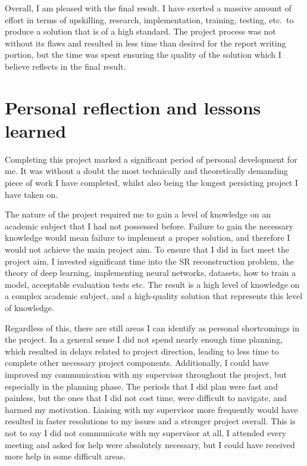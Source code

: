 \begin{appendices}
Overall, I am pleased with the final result. I have exerted a massive amount of effort in terms of upskilling, research, implementation, training, testing, etc.\ to produce a solution that is of a high standard. The project process was not without its flaws and resulted in less time than desired for the report writing portion, but the time was spent ensuring the quality of the solution which I believe reflects in the final result.

\section{Personal reflection and lessons learned}
Completing this project marked a significant period of personal development for me. It was without a doubt the most technically and theoretically demanding piece of work I have completed, whilst also being the longest persisting project I have taken on.

The nature of the project required me to gain a level of knowledge on an academic subject that I had not possessed before. Failure to gain the necessary knowledge would mean failure to implement a proper solution, and therefore I would not achieve the main project aim. To ensure that I did in fact meet the project aim, I invested significant time into the SR reconstruction problem, the theory of deep learning, implementing neural networks, datasets, how to train a model, acceptable evaluation tests etc. The result is a high level of knowledge on a complex academic subject, and a high-quality solution that represents this level of knowledge.

Regardless of this, there are still areas I can identify as personal shortcomings in the project. In a general sense I did not spend nearly enough time planning, which resulted in delays related to project direction, leading to less time to complete other necessary project components. Additionally, I could have improved my communication with my supervisor throughout the project, but especially in the planning phase. The periods that I did plan were fast and painless, but the ones that I did not cost time, were difficult to navigate, and harmed my motivation. Liaising with my supervisor more frequently would have resulted in faster resolutions to my issues and a stronger project overall. This is not to say I did not communicate with my supervisor at all, I attended every meeting and asked for help were absolutely necessary, but I could have received more help in some difficult areas.


\end{appendices}
